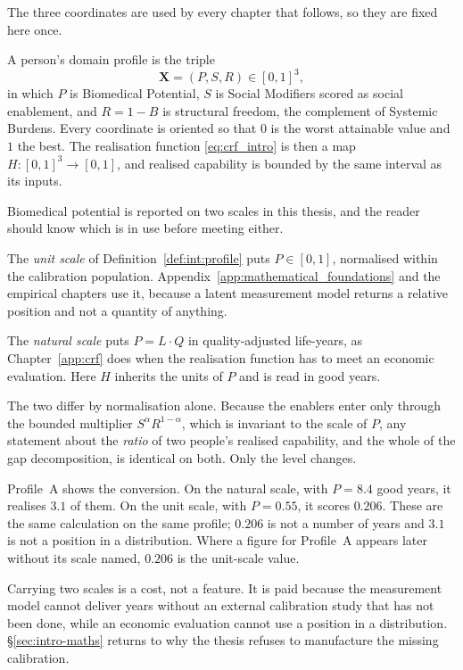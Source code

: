 The three coordinates are used by every chapter that follows, so they are
fixed here once.

\begin{definition}
\label{def:int:profile}
A person's domain profile is the triple
\[
  \mathbf X=(P,S,R)\in[0,1]^3,
\]
in which $P$ is Biomedical Potential, $S$ is Social Modifiers scored as social
enablement, and $R=1-B$ is structural freedom, the complement of Systemic
Burdens. Every coordinate is oriented so that $0$ is the worst attainable value
and $1$ the best. The realisation function \eqref{eq:crf_intro} is then a map
$H:[0,1]^3\to[0,1]$, and realised capability is bounded by the same interval as
its inputs.

\end{definition}

\begin{remark}
\label{rem:int:scales}
Biomedical potential is reported on two scales in this thesis, and the reader
should know which is in use before meeting either.

The \emph{unit scale} of Definition~\ref{def:int:profile} puts $P\in[0,1]$,
normalised within the calibration population. Appendix~\ref{app:mathematical_foundations}
and the empirical chapters use it, because a latent measurement model returns a
relative position and not a quantity of anything.

The \emph{natural scale} puts $P=L\cdot Q$ in quality-adjusted life-years, as
Chapter~\ref{app:crf} does when the realisation function has to meet an
economic evaluation. Here $H$ inherits the units of $P$ and is read in good
years.

The two differ by normalisation alone. Because the enablers enter only through
the bounded multiplier $S^{\alpha}R^{1-\alpha}$, which is invariant to the
scale of $P$, any statement about the \emph{ratio} of two people's realised
capability, and the whole of the gap decomposition, is identical on both. Only
the level changes.

Profile~A shows the conversion. On the natural scale, with $P=8.4$ good
years, it realises $3.1$ of them. On the unit scale, with $P=0.55$, it scores
$0.206$. These are the same calculation on the same profile;
$0.206$ is not a number of years and $3.1$ is not a position in a
distribution. Where a figure for Profile~A appears later without its scale
named, $0.206$ is the unit-scale value.

Carrying two scales is a cost, not a feature. It is paid because the
measurement model cannot deliver years without an external calibration study
that has not been done, while an economic evaluation cannot use a position in a
distribution. \S\ref{sec:intro-maths} returns to why the thesis refuses to
manufacture the missing calibration.
\end{remark}

